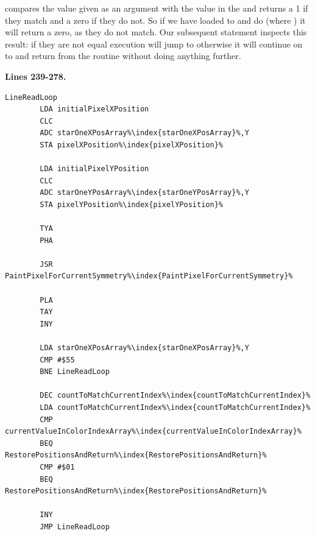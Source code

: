 \begin{definition2}
\setlength{\intextsep}{0pt}%
\setlength{\columnsep}{3pt}%
\small
{} compares the value given as an argument with the value in the  and returns a 1 if they match and a zero if they
  do not. So if we have loaded  to  and do  (where ) it will return a zero,
  as they do not match. Our subsequent statement  inspects this result: if they are not equal execution will
  jump to  otherwise it will continue on to  and return from the routine without doing anything further.
\end{definition2}
\clearpage
\textbf{Lines 239-278. }
\begin{lstlisting}[caption=The core pattern-painting loop.,escapechar=\%]
LineReadLoop   
        LDA initialPixelXPosition
        CLC 
        ADC starOneXPosArray%\index{starOneXPosArray}%,Y
        STA pixelXPosition%\index{pixelXPosition}%

        LDA initialPixelYPosition
        CLC 
        ADC starOneYPosArray%\index{starOneYPosArray}%,Y
        STA pixelYPosition%\index{pixelYPosition}%

        TYA 
        PHA 

        JSR PaintPixelForCurrentSymmetry%\index{PaintPixelForCurrentSymmetry}%

        PLA 
        TAY 
        INY 

        LDA starOneXPosArray%\index{starOneXPosArray}%,Y
        CMP #$55
        BNE LineReadLoop

        DEC countToMatchCurrentIndex%\index{countToMatchCurrentIndex}%
        LDA countToMatchCurrentIndex%\index{countToMatchCurrentIndex}%
        CMP currentValueInColorIndexArray%\index{currentValueInColorIndexArray}%
        BEQ RestorePositionsAndReturn%\index{RestorePositionsAndReturn}%
        CMP #$01
        BEQ RestorePositionsAndReturn%\index{RestorePositionsAndReturn}%

        INY 
        JMP LineReadLoop

\end{lstlisting}

